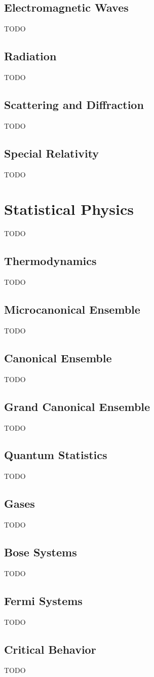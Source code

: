 \documentclass[12pt]{article}
\begin{document}
\subsection{Electromagnetic Waves}
TODO
\subsection{Radiation}
TODO
\subsection{Scattering and Diffraction}
TODO
\subsection{Special Relativity}
TODO




\section{Statistical Physics}
TODO
\subsection{Thermodynamics}
TODO
\subsection{Microcanonical Ensemble}
TODO
\subsection{Canonical Ensemble}
TODO
\subsection{Grand Canonical Ensemble}
TODO
\subsection{Quantum Statistics}
TODO
\subsection{Gases}
TODO
\subsection{Bose Systems}
TODO
\subsection{Fermi Systems}
TODO
\subsection{Critical Behavior}
TODO
\end{document}
